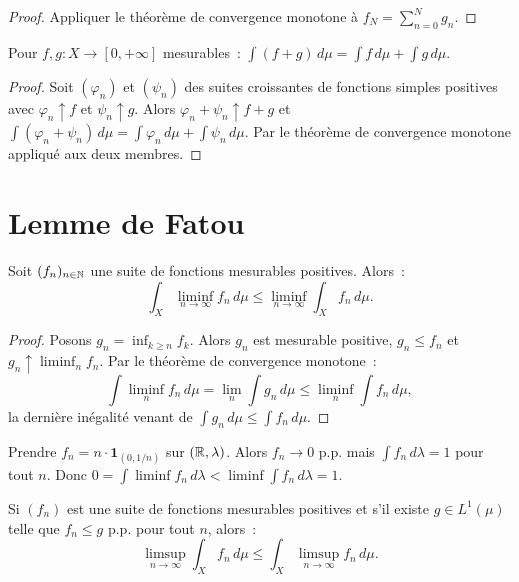 \begin{proof}
Appliquer le th\'eor\`eme de convergence monotone \`a $f_N = \sum_{n=0}^N g_n$.
\end{proof}

\begin{corollaire}
Pour $f, g : X \to [0, +\infty]$ mesurables~:
$\int (f + g)\, d\mu = \int f\, d\mu + \int g\, d\mu$.
\end{corollaire}

\begin{proof}
Soit $(\varphi_n)$ et $(\psi_n)$ des suites croissantes de fonctions simples
positives avec $\varphi_n \uparrow f$ et $\psi_n \uparrow g$. Alors
$\varphi_n + \psi_n \uparrow f + g$ et
$\int (\varphi_n + \psi_n)\, d\mu = \int \varphi_n\, d\mu + \int \psi_n\, d\mu$.
Par le th\'eor\`eme de convergence monotone appliqu\'e aux deux membres.
\end{proof}

\section{Lemme de Fatou}

\begin{theoreme}
\label{thm:fatou}
Soit $(f_n)_{n \in \mathbb{N}}$ une suite de fonctions mesurables positives. Alors~:
\[
\int_X \liminf_{n \to \infty} f_n\, d\mu \leq
\liminf_{n \to \infty} \int_X f_n\, d\mu.
\]
\end{theoreme}

\begin{proof}
Posons $g_n = \inf_{k \geq n} f_k$. Alors $g_n$ est mesurable positive,
$g_n \leq f_n$ et $g_n \uparrow \liminf_n f_n$. Par le th\'eor\`eme de convergence
monotone~:
\[
\int \liminf_n f_n\, d\mu = \lim_n \int g_n\, d\mu \leq
\liminf_n \int f_n\, d\mu,
\]
la derni\`ere in\'egalit\'e venant de $\int g_n\, d\mu \leq \int f_n\, d\mu$.
\end{proof}

\begin{attention}[title=\textbf{L'in\'egalit\'e peut \^etre stricte}]
Prendre $f_n = n \cdot \mathbf{1}_{(0, 1/n)}$ sur $(\mathbb{R}, \lambda)$. Alors
$f_n \to 0$ p.p. mais $\int f_n\, d\lambda = 1$ pour tout $n$. Donc
$0 = \int \liminf f_n\, d\lambda < \liminf \int f_n\, d\lambda = 1$.
\end{attention}

\begin{corollaire}
Si $(f_n)$ est une suite de fonctions mesurables positives et s'il existe
$g \in L^1(\mu)$ telle que $f_n \leq g$ p.p. pour tout $n$, alors~:
\[
\limsup_{n \to \infty} \int_X f_n\, d\mu \leq
\int_X \limsup_{n \to \infty} f_n\, d\mu.
\]
\end{corollaire}

